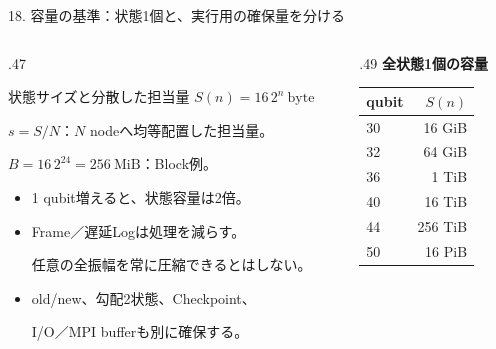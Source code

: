 \begin{frame}{18. 容量の基準：状態1個と、実行用の確保量を分ける}
  \begin{columns}[T,onlytextwidth]
    \begin{column}{.47\textwidth}
      \begin{block}{状態サイズと分散した担当量}
        \small $S(n)=16\,2^n\ \mathrm{byte}$\par
        $s=S/N$：$N$ nodeへ均等配置した担当量。\par
        $B=16\,2^{24}=256\ \mathrm{MiB}$：Block例。
      \end{block}
      \begin{itemize}\small
        \item 1 qubit増えると、状態容量は2倍。
        \item Frame／遅延Logは処理を減らす。\par
              任意の全振幅を常に圧縮できるとはしない。
        \item old/new、勾配2状態、Checkpoint、\par
              I/O／MPI bufferも別に確保する。
      \end{itemize}
    \end{column}
    \begin{column}{.49\textwidth}
      \textbf{全状態1個の容量}\par\medskip
      \begin{tabularx}{\linewidth}{@{}Xr@{}}
        \toprule qubit & $S(n)$ \\
        \midrule
        30 & 16 GiB \\
        32 & 64 GiB \\
        36 & 1 TiB \\
        40 & 16 TiB \\
        44 & 256 TiB \\
        50 & 16 PiB \\
        \bottomrule
      \end{tabularx}
      \medskip
    \end{column}
  \end{columns}
\end{frame}

